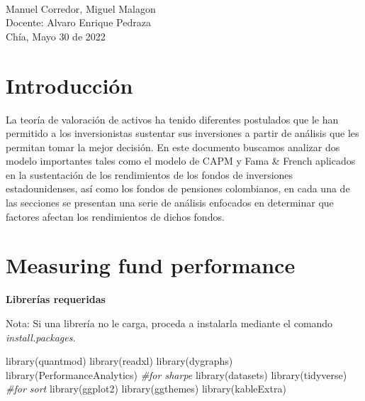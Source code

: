 \documentclass[
  12pt,
]{article}
\newenvironment{Shaded}{\begin{snugshade}}{\end{snugshade}}
\newcommand{\CommentTok}[1]{\textcolor[rgb]{0.56,0.35,0.01}{\textit{#1}}}
\newcommand{\FunctionTok}[1]{\textcolor[rgb]{0.00,0.00,0.00}{#1}}
\newcommand{\NormalTok}[1]{#1}
\begin{document}
\begin{titlepage}
\begin{minipage}{14cm}
\HRule \\[1.5cm]


{\Large
Manuel Corredor,
Miguel Malagon } \\[1cm]


{\Large
Docente: Alvaro Enrique Pedraza} \\[2cm]

{\large
Chía, Mayo 30 de 2022
}

\end{minipage}

\vfill %

\cleardoublepage
\thispagestyle{empty}
\end{titlepage}

\raggedbottom


{
\setcounter{tocdepth}{3}
\tableofcontents
}
\newpage

\hypertarget{introducciuxf3n}{%
\section{Introducción}\label{introducciuxf3n}}

La teoría de valoración de activos ha tenido diferentes postulados que
le han permitido a los inversionistas sustentar sus inversiones a partir
de análisis que les permitan tomar la mejor decisión. En este documento
buscamos analizar dos modelo importantes tales como el modelo de CAPM y
Fama \& French aplicados en la sustentación de los rendimientos de los
fondos de inversiones estadounidenses, así como los fondos de pensiones
colombianos, en cada una de las secciones se presentan una serie de
análisis enfocados en determinar que factores afectan los rendimientos
de dichos fondos. \newpage

\hypertarget{measuring-fund-performance}{%
\section{Measuring fund performance}\label{measuring-fund-performance}}

\textbf{Librerías requeridas}

Nota: Si una librería no le carga, proceda a instalarla mediante el
comando \emph{install.packages}.

\begin{Shaded}
\begin{Highlighting}[]
\FunctionTok{library}\NormalTok{(quantmod)}
\FunctionTok{library}\NormalTok{(readxl)}
\FunctionTok{library}\NormalTok{(dygraphs)}
\FunctionTok{library}\NormalTok{(PerformanceAnalytics) }\CommentTok{\#for sharpe}
\FunctionTok{library}\NormalTok{(datasets)}
\FunctionTok{library}\NormalTok{(tidyverse) }\CommentTok{\#for sort}
\FunctionTok{library}\NormalTok{(ggplot2)}
\FunctionTok{library}\NormalTok{(ggthemes)}
\FunctionTok{library}\NormalTok{(kableExtra)}
\end{Highlighting}
\end{Shaded}
\end{document}
